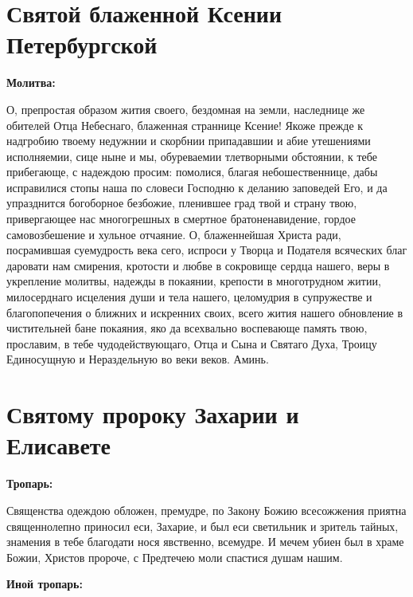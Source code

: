 \section{Святой блаженной Ксении Петербургской}
 
\bfseries Молитва:\normalfont{}


О, препростая образом жития своего, бездомная на земли, наследнице же обителей Отца Небеснаго, блаженная страннице Ксение! Якоже прежде к надгробию твоему недужнии и скорбнии припадавшии и абие утешениями исполняемии, сице ныне и мы, обуреваемии тлетворными обстоянии, к тебе прибегающе, с надеждою просим: помолися, благая небошественнице, дабы исправилися стопы наша по словеси Господню к деланию заповедей Его, и да упразднится богоборное безбожие, пленившее град твой и страну твою, привергающее нас многогрешных в смертное братоненавидение, гордое самовозбешение и хульное отчаяние. О, блаженнейшая Христа ради, посрамившая суемудрость века сего, испроси у Творца и Подателя всяческих благ даровати нам смирения, кротости и любве в сокровище сердца нашего, веры в укрепление молитвы, надежды в покаянии, крепости в многотрудном житии, милосерднаго исцеления души и тела нашего, целомудрия в супружестве и благопопечения о ближних и искренних своих, всего жития нашего обновление в чистительней бане покаяния, яко да всехвально воспевающе память твою, прославим, в тебе чудодействующаго, Отца и Сына и Святаго Духа, Троицу Единосущную и Нераздельную во веки веков. Аминь.

\bigskip\bigskip\mychapterending


 

\section{Святому пророку Захарии и Елисавете}
 
\bfseries Тропарь:\normalfont{}


Священства одеждою обложен, премудре, по Закону Божию всесожжения приятна священнолепно приносил еси, Захарие, и был еси светильник и зритель тайных, знамения в тебе благодати нося явственно, всемудре. И мечем убиен был в храме Божии, Христов пророче, с Предтечею моли спастися душам нашим.


\medskip
\bfseries Иной тропарь:\normalfont{}


